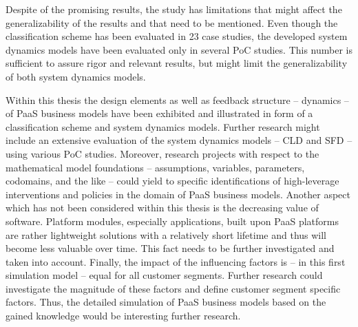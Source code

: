 Despite of the promising results, the study has limitations that might affect the generalizability of the results and that need to be mentioned. Even though the classification scheme has been evaluated in 23 case studies, the developed system dynamics models have been evaluated only in several \ac{PoC} studies. This number is sufficient to assure rigor and relevant results, but might limit the generalizability of both system dynamics models.

Within this thesis the design elements as well as feedback structure -- dynamics -- of \ac{PaaS} business models have been exhibited and illustrated in form of a classification scheme and system dynamics models. Further research might include an extensive evaluation of the system dynamics models -- \ac{CLD} and \ac{SFD} -- using various \ac{PoC} studies. Moreover, research projects with respect to the mathematical model foundations -- assumptions, variables, parameters, codomains, and the like -- could yield to specific identifications of high-leverage interventions and policies in the domain of \ac{PaaS} business models. Another aspect which has not been considered within this thesis is the decreasing value of software. Platform modules, especially applications, built upon \ac{PaaS} platforms are rather lightweight solutions with a relatively short lifetime and thus will become less valuable over time. This fact needs to be further investigated and taken into account. Finally, the impact of the influencing factors is -- in this first simulation model -- equal for all customer segments. Further research could investigate the magnitude of these factors and define customer segment specific factors. Thus, the detailed simulation of \ac{PaaS} business models based on the gained knowledge would be interesting further research.
